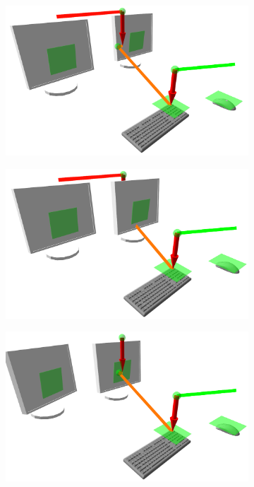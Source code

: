 \begin{figure}
\begin{center}
\begin{subfigure}[b]{.3\textwidth}
  \end{subfigure}
  \begin{subfigure}[b]{.3\textwidth}
    \includegraphics[width=1\linewidth]{bilder/paper_fotos/s7.png}
  \end{subfigure}
  \begin{subfigure}[b]{.3\textwidth}
    \includegraphics[width=1\linewidth]{bilder/paper_fotos/s5.png}
  \end{subfigure}
  \begin{subfigure}[b]{.3\textwidth}
    \includegraphics[width=1\linewidth]{bilder/paper_fotos/s4.png}

\end{subfigure}
\end{center}
\end{figure}
